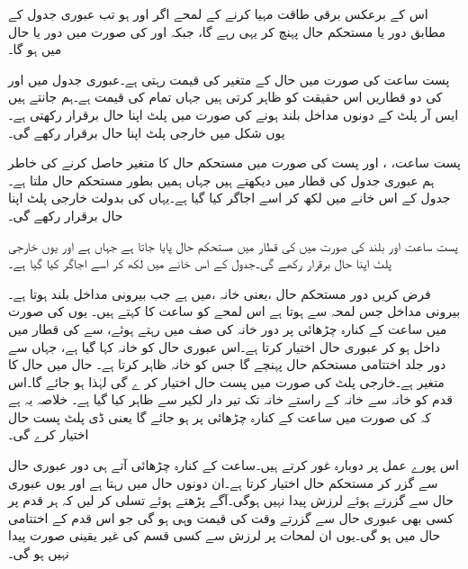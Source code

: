 اس کے برعکس برقی طاقت مہیا کرنے کے لمحے اگر  اور  ہو تب عبوری جدول کے مطابق دور  یا  مستحکم حال پہنچ کر یہی رہے گا، جبکہ  اور  کی صورت میں دور  یا  حال میں ہو گا۔

پست ساعت کی صورت میں حال کے متغیر  کی قیمت  رہتی ہے۔عبوری جدول میں  اور  کی دو قطاریں اس حقیقت کو ظاہر کرتی ہیں جہاں تمام  کی قیمت  ہے۔ہم جانتے ہیں ایس آر پلٹ کے دونوں مداخل بلند ہونے کی صورت میں پلٹ اپنا حال برقرار رکھتی ہے۔یوں شکل   میں خارجی پلٹ اپنا حال برقرار رکھے گی۔

پست ساعت، ، اور پست  کی صورت میں مستحکم حال کا متغیر  حاصل کرنے کی خاطر ہم عبوری جدول کی  قطار میں دیکھتے ہیں جہاں ہمیں   بطور مستحکم حال ملتا ہے۔جدول کے اس خانے میں  لکھ کر اسے اجاگر کیا گیا ہے۔یہاں  کی بدولت خارجی پلٹ اپنا حال برقرار رکھے گی۔

پست ساعت اور بلند  کی صورت میں  کی قطار میں مستحکم حال  پایا جاتا ہے جہاں  ہے اور یوں خارجی پلٹ اپنا حال برقرار رکھے گی۔جدول کے اس خانے میں  لکھ کر اسے اجاگر کیا گیا ہے۔

فرض کریں دور مستحکم حال ،یعنی خانہ  ،میں ہے جب بیرونی مداخل  بلند ہوتا ہے۔بیرونی مداخل  جس لمحہ  سے  ہوتا ہے اس لمحے کو ساعت کا  کہتے ہیں۔ یوں  کی صورت میں ساعت کے کنارہ چڑھائی پر دور خانہ  کی صف میں رہتے ہوئے،  سے  کی قطار میں داخل ہو کر عبوری حال  اختیار کرتا ہے۔اس عبوری حال کو خانہ  کہا گیا ہے، جہاں سے دور جلد اختتامی مستحکم حال  پہنچے گا جس کو خانہ  ظاہر کرتا ہے۔ حال  میں حال کا متغیر  ہے۔خارجی پلٹ  کی صورت میں پست حال اختیار کر ے گی لہٰذا  ہو جائے گا۔اس قدم کو خانہ سے خانہ  کے راستے خانہ  تک تیر دار لکیر سے ظاہر کیا گیا ہے۔ خلاصہ یہ ہے کہ  کی صورت میں ساعت کے کنارہ چڑھائی پر  ہو جائے گا یعنی ڈی پلٹ پست حال اختیار کرے گی۔

اس پورے عمل پر دوبارہ غور کرتے ہیں۔ساعت کے کنارہ چڑھائی آتے ہی دور عبوری حال  سے گزر کر مستحکم حال  اختیار کرتا ہے۔ان دونوں حال میں  رہتا ہے اور یوں عبوری حال سے گزرتے ہوئے لرزش پیدا نہیں ہوگی۔آگے پڑھتے ہوئے تسلی کر لیں کہ ہر قدم پر کسی بھی عبوری حال سے گزرتے وقت  کی قیمت وہی ہو گی جو اس قدم کے اختتامی حال میں ہو گی۔یوں ان لمحات پر لرزش سے کسی قسم کی غیر یقینی صورت پیدا نہیں ہو گی۔

